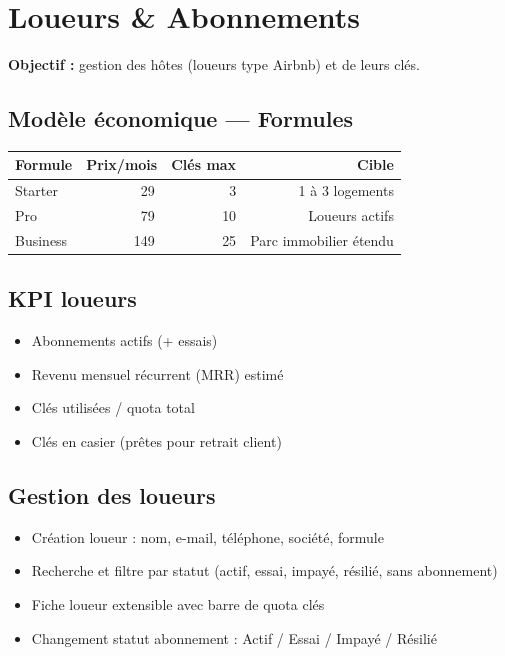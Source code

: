 \documentclass[11pt,a4paper]{article}
\begin{document}
\section{Loueurs \& Abonnements}

\textbf{Objectif :} gestion des hôtes (loueurs type Airbnb) et de leurs clés.

\subsection{Modèle économique — Formules}

\begin{center}
\begin{tabular}{lrrr}
  \toprule
  \textbf{Formule} & \textbf{Prix/mois} & \textbf{Clés max} & \textbf{Cible} \\
  \midrule
  Starter & 29\,\EUR{} & 3 & 1 à 3 logements \\
  Pro & 79\,\EUR{} & 10 & Loueurs actifs \\
  Business & 149\,\EUR{} & 25 & Parc immobilier étendu \\
  \bottomrule
\end{tabular}
\end{center}

\subsection{KPI loueurs}
\begin{itemize}[noitemsep]
  \item Abonnements actifs (+ essais)
  \item Revenu mensuel récurrent (MRR) estimé
  \item Clés utilisées / quota total
  \item Clés en casier (prêtes pour retrait client)
\end{itemize}

\subsection{Gestion des loueurs}
\begin{itemize}
  \item Création loueur : nom, e-mail, téléphone, société, formule
  \item Recherche et filtre par statut (actif, essai, impayé, résilié, sans abonnement)
  \item Fiche loueur extensible avec barre de quota clés
  \item Changement statut abonnement : Actif / Essai / Impayé / Résilié
\end{itemize}
\end{document}
